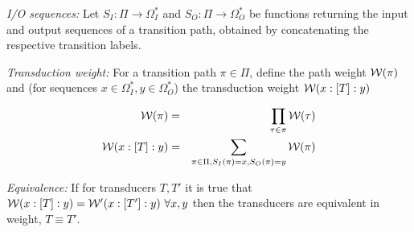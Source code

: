 \documentclass{article}
\newcommand\wtrans[4]{#1(#2 : [#3] : #4)}
\newcommand\transequiv{\equiv}
\newcommand\Transitions{\tau}
\newcommand\weight{{\cal W}}
\begin{document}
{\em I/O sequences:}
Let
$S_I:\Pi \to \Omega_I^\ast$ and
$S_O:\Pi \to \Omega_O^\ast$
be functions returning the input and output sequences of a transition path,
obtained by concatenating the respective transition labels.

{\em Transduction weight:}
For a transition path $\pi \in \Pi$,
define the path weight $\weight(\pi)$ and
(for sequences $x \in \Omega_I^\ast, y \in \Omega_O^\ast$)
the transduction weight $\wtrans{\weight}{x}{T}{y}$

\begin{eqnarray*}
\weight(\pi) & = & \prod_{\Transitions \in \pi} \weight(\Transitions) \\
\wtrans{\weight}{x}{T}{y} & = & \sum_{\pi \in \Pi, S_I(\pi)=x, S_O(\pi)=y} \weight(\pi)
\end{eqnarray*}

{\em Equivalence:}
If for transducers $T,T'$ it is true that $\wtrans{\weight}{x}{T}{y}=\wtrans{\weight'}{x}{T'}{y}\ \forall x,y$ then the transducers are equivalent in weight, $T \transequiv T'$.
\end{document}
